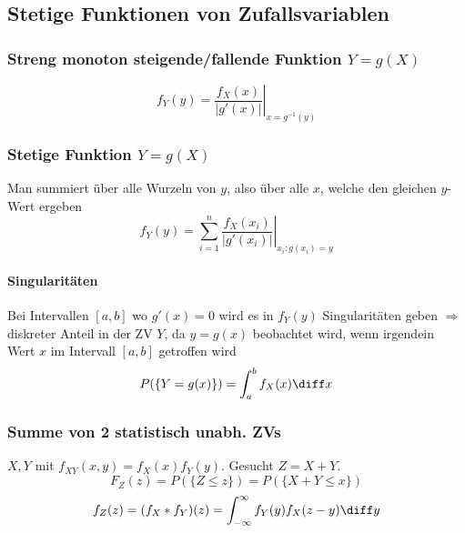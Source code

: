 \subsection{Stetige Funktionen von Zufallsvariablen}
\begin{sectionbox}
    \subsubsection{Streng monoton steigende/fallende Funktion $Y=g(X)$}
    \begin{equation*}
        f_Y(y) = \left.\frac{f_X(x)}{|g'(x)|}\right|_{x=g^{-1}(y)}
    \end{equation*}
\end{sectionbox}

\begin{sectionbox}
    \subsubsection{Stetige Funktion $Y=g(X)$}
    Man summiert über alle Wurzeln von $y$, also über alle $x$, welche den gleichen $y$-Wert ergeben
    \begin{equation*}
        f_Y(y)=\sum_{i=1}^{n}\left.\frac{f_X(x_i)}{|g'(x_i)|}\right|_{x_i:g(x_i)=y}
    \end{equation*}

    \paragraph{Singularitäten} Bei Intervallen $[a,b]$ wo $g'(x)=0$ wird es in $f_Y(y)$ Singularitäten geben $\Longrightarrow$ diskreter Anteil in der ZV $Y$, da $y=g(x)$ beobachtet wird, wenn irgendein Wert $x$ im Intervall $[a,b]$ getroffen wird
    \begin{equation*}
        P(\{Y=g(x)\})=\int_a^b f_X(x)\diff x
    \end{equation*}
\end{sectionbox}

\begin{sectionbox}
    \subsubsection{Summe von 2 statistisch unabh. ZVs}
    $X,Y$ mit $f_{XY}(x,y)=f_X(x)f_Y(y)$. Gesucht $Z=X+Y$.
    \begin{equation*}
        F_Z(z)=P(\{Z\le z\}) = P(\{X+Y\le x\})
    \end{equation*}
    \begin{equation*}
        f_Z(z)=(f_X * f_Y)(z)=\int_{-\infty}^\infty f_Y(y)f_X(z-y)\diff y
    \end{equation*}
\end{sectionbox}

